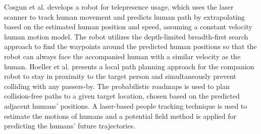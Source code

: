 \documentclass[letterpaper, 10 pt, conference]{ieeeconf}
\begin{document}
	
	Cosgun et al.\cite{cosgun2013autonomous} develops a robot for telepresence usage, which uses the laser scanner to track human movement and predicts human path by extrapolating based on the estimated human position and speed, assuming a constant velocity human motion model.
	The robot utilizes the depth-limited breadth-first search approach to find the waypoints around the predicted human positions so that the robot can always face the accompanied human with a similar velocity as the human.
	Hoeller et al.\cite{hoeller2007accompanying} presents a local path planning approach for the companion robot to stay in proximity to the target person and simultaneously prevent colliding with any passers-by. 
	The probabilistic roadmaps is used to plan collision-free paths to a given target location, chosen based on the predicted adjacent humans' positions.
	A laser-based people tracking technique is used to estimate the motions of humans and a potential field method is applied for predicting the humans’ future trajectories.
	
\end{document}
